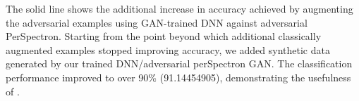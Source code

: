 The solid line shows the additional increase in accuracy achieved by augmenting the adversarial examples using GAN-trained DNN against adversarial PerSpectron. Starting from the point beyond which additional classically augmented examples stopped improving accuracy, we added synthetic data generated by our trained DNN/adversarial perSpectron GAN. The classification performance improved to over 90\% (91.14454905), demonstrating the usefulness of \scheme. 





